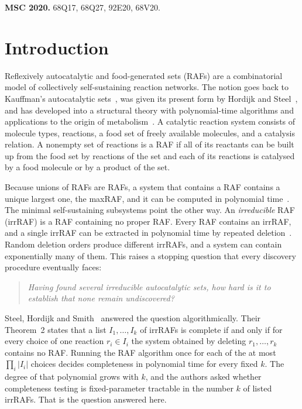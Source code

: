 \documentclass[11pt,a4paper]{article}
\theoremstyle{plain}
\theoremstyle{definition}
\theoremstyle{remark}
\begin{document}
\medskip
\noindent\textbf{MSC 2020.} 68Q17, 68Q27, 92E20, 68V20.

\section{Introduction}\label{sec:intro}

Reflexively autocatalytic and food-generated sets (RAFs) are a combinatorial model of collectively self-sustaining reaction networks. The notion goes back to Kauffman's autocatalytic sets~\cite{kauffman1986autocatalytic}, was given its present form by Hordijk and Steel~\cite{hordijk2004detecting}, and has developed into a structural theory with polynomial-time algorithms and applications to the origin of metabolism~\cite{hordijk2012structure,hordijk2015algorithms,hordijk2017chasing,steel2019autocatalytic,steel2020structure,xavier2020autocatalytic}. A catalytic reaction system consists of molecule types, reactions, a food set of freely available molecules, and a catalysis relation. A nonempty set of reactions is a RAF if all of its reactants can be built up from the food set by reactions of the set and each of its reactions is catalysed by a food molecule or by a product of the set.

Because unions of RAFs are RAFs, a system that contains a RAF contains a unique largest one, the maxRAF, and it can be computed in polynomial time~\cite{hordijk2004detecting}. The minimal self-sustaining subsystems point the other way. An \emph{irreducible} RAF (irrRAF) is a RAF containing no proper RAF. Every RAF contains an irrRAF, and a single irrRAF can be extracted in polynomial time by repeated deletion~\cite{steel2013minimal,hordijk2015algorithms}. Random deletion orders produce different irrRAFs, and a system can contain exponentially many of them. This raises a stopping question that every discovery procedure eventually faces:
\begin{quote}
\emph{Having found several irreducible autocatalytic sets, how hard is it to establish that none remain undiscovered?}
\end{quote}
Steel, Hordijk and Smith~\cite[Section~6.1]{steel2013minimal} answered the question algorithmically. Their Theorem~2 states that a list $I_1,\dots,I_k$ of irrRAFs is complete if and only if for every choice of one reaction $r_i\in I_i$ the system obtained by deleting $r_1,\dots,r_k$ contains no RAF. Running the RAF algorithm once for each of the at most $\prod_i|I_i|$ choices decides completeness in polynomial time for every fixed $k$. The degree of that polynomial grows with $k$, and the authors asked whether completeness testing is fixed-parameter tractable in the number $k$ of listed irrRAFs. That is the question answered here.
\end{document}
